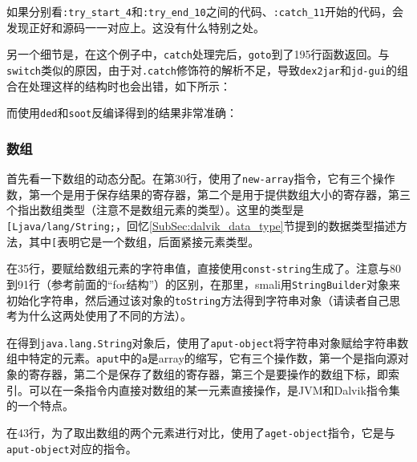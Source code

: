 如果分别看\lstinline!:try_start_4!和\lstinline!:try_end_10!之间的代码、\lstinline!:catch_11!开始的代码，会发现正好和源码一一对应上。这没有什么特别之处。

另一个细节是，在这个例子中，\lstinline!catch!处理完后，\lstinline!goto!到了195行函数返回。与\lstinline!switch!类似的原因，由于对\lstinline!.catch!修饰符的解析不足，导致\lstinline!dex2jar!和\lstinline!jd-gui!的组合在处理这样的结构时也会出错，如下所示：


而使用\lstinline!ded!和\lstinline!soot!反编译得到的结果非常准确：


\subsubsection{数组}



首先看一下数组的动态分配。在第30行，使用了\lstinline!new-array!指令，它有三个操作数，第一个是用于保存结果的寄存器，第二个是用于提供数组大小的寄存器，第三个指出数组类型（注意不是数组元素的类型）。这里的类型是\lstinline![Ljava/lang/String;!，回忆\ref{SubSec:dalvik_data_type}节提到的数据类型描述方法，其中\lstinline![!表明它是一个数组，后面紧接元素类型。

在35行，要赋给数组元素的字符串值，直接使用\lstinline!const-string!生成了。注意与80到91行（参考前面的“for结构”）的区别，在那里，smali用\lstinline!StringBuilder!对象来初始化字符串，然后通过该对象的\lstinline!toString!方法得到字符串对象（请读者自己思考为什么这两处使用了不同的方法）。

在得到\lstinline!java.lang.String!对象后，使用了\lstinline!aput-object!将字符串对象赋给字符串数组中特定的元素。\lstinline!aput!中的\lstinline!a!是array的缩写，它有三个操作数，第一个是指向源对象的寄存器，第二个是保存了数组的寄存器，第三个是要操作的数组下标，即索引。可以在一条指令内直接对数组的某一元素直接操作，是JVM和Dalvik指令集的一个特点。

在43行，为了取出数组的两个元素进行对比，使用了\lstinline!aget-object!指令，它是与\lstinline!aput-object!对应的指令。


